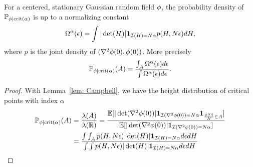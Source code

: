 \begin{corollary}
	For a centered, stationary Gaussian random field \(\phi\), the probability
	density of \(\mathbb{P}_{\phi\mid\text{crit}(\alpha)}\) is up to a normalizing
	constant
	\begin{equation*}
		\Omega^\alpha(\epsilon)
		= \int |\det(H)| \mathbf{1}_{\mathcal{I}(H) = N\alpha} p(H, N\epsilon)dH,
	\end{equation*}
	where \(p\) is the joint density of \((\nabla^2 \phi(0), \phi(0))\).
	More precisely
	\[
		\mathbb{P}_{\phi\mid\text{crit}(\alpha)}(A)
		= \frac{\int_A \Omega^\alpha(\epsilon)d\epsilon}{\int \Omega^\alpha(\epsilon)d\epsilon}.
	\]
\end{corollary}
\begin{proof}
	With Lemma~\ref{lem: Campbell}, we have the height distribution of critical
	points with index \(\alpha\)
	\begin{align*}
		\mathbb{P}_{\phi\mid \text{crit}(\alpha)}(A)
		&= \frac{\lambda(A)}{\lambda(\mathbb{R})}
		= \frac{
			\mathbb{E}[|\det(\nabla^2 \phi(0))|
			\mathbf{1}_{\mathcal{I}(\nabla^2\phi(0))=N\alpha}
			\mathbf{1}_{\frac{\phi(0)}{N} \in A}
			]
		}{
			\mathbb{E}[|\det(\nabla^2 \phi(0))|\mathbf{1}_{\mathcal{I}(\nabla^2\phi(0))=N\alpha}]
		}\\
		&= \frac{
			\int \int_A p(H, N \epsilon) |\det(H)|
			\mathbf{1}_{\mathcal{I}(H)=N\alpha}d\epsilon dH
		}{
			\int \int p(H, N \epsilon) |\det(H)|
			\mathbf{1}_{\mathcal{I}(H)=N\alpha}d\epsilon dH
		}
		\qedhere
	\end{align*}
\end{proof}